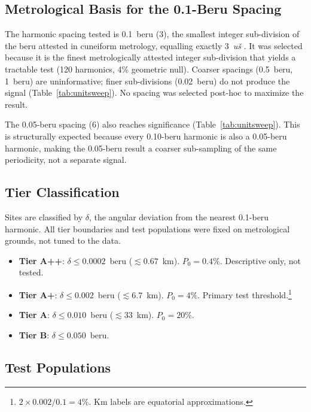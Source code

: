 \documentclass[12pt,a4paper]{article}
\begin{document}
\subsection{Metrological Basis for the 0.1-Beru Spacing}
\label{sec:metrology_basis}

The harmonic spacing tested is 0.1~beru (3\textdegree{}), the smallest integer
sub-division of the beru attested in cuneiform metrology, equalling exactly
3~\textit{u\v{s}} \citep{hunger2019mul,robson2008mathematics,powell1987metrological}.
It was selected because it is the finest metrologically attested integer
sub-division that yields a tractable test (120 harmonics, 4\% geometric null).
Coarser spacings (0.5~beru, 1~beru) are uninformative; finer sub-divisions
(0.02~beru) do not produce the signal (Table~\ref{tab:unitsweep}).
No spacing was selected post-hoc to maximize the result.

The 0.05-beru spacing (6\textdegree{}) also reaches significance
(Table~\ref{tab:unitsweep}). This is structurally expected because every
0.10-beru harmonic is also a 0.05-beru harmonic, making the 0.05-beru
result a coarser sub-sampling of the same periodicity, not a separate signal.

\subsection{Tier Classification}

Sites are classified by $\delta$, the angular deviation from the
nearest 0.1-beru harmonic. All tier boundaries and test populations were
fixed on metrological grounds, not tuned to the data.

\begin{itemize}
  \item \textbf{Tier A++}: $\delta \leq 0.0002$~beru ($\lesssim 0.67$~km).
    $P_0 = 0.4\%$. Descriptive only, not tested.
  \item \textbf{Tier A+}: $\delta \leq 0.002$~beru ($\lesssim 6.7$~km).
    $P_0 = 4\%$. Primary test threshold.\footnote{$2 \times 0.002 / 0.1 = 4\%$.
    Km labels are equatorial approximations.}
  \item \textbf{Tier A}: $\delta \leq 0.010$~beru ($\lesssim 33$~km).
    $P_0 = 20\%$.
  \item \textbf{Tier B}: $\delta \leq 0.050$~beru.
\end{itemize}

\subsection{Test Populations}
\label{sec:test_populations}
\end{document}

